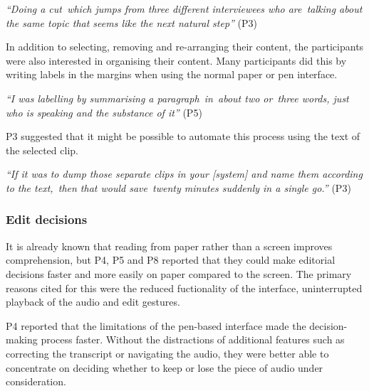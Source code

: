 \textit{``Doing a cut which jumps from three different interviewees who are talking about the same topic that seems
like the next natural step''} (P3)


In addition to selecting, removing and re-arranging their content, the participants were also interested in organising
their content.
Many participants did this by writing labels in the margins when using the normal paper or pen interface.

\textit{``I was labelling by summarising a paragraph in about two or three words, just who is speaking and the
substance of it''} (P5)

P3 suggested that it might be possible to automate this process using the text of the selected clip.


\textit{``If it was to dump those separate clips in your [system] and name them according to the text, then that would
save twenty minutes suddenly in a single go.''} (P3)


\subsubsection{Edit decisions}

It is already known that reading from paper rather than a screen improves comprehension, but P4, P5 and P8 reported
that they could make editorial decisions faster and more easily on paper compared to the screen. The primary
reasons cited for this were the reduced fuctionality of the interface, uninterrupted playback of the audio and edit
gestures.

P4 reported that the limitations of the pen-based interface made the decision-making process faster. Without the
distractions of additional features such as correcting the transcript or navigating the audio, they were better able to
concentrate on deciding whether to keep or lose the piece of audio under consideration.


